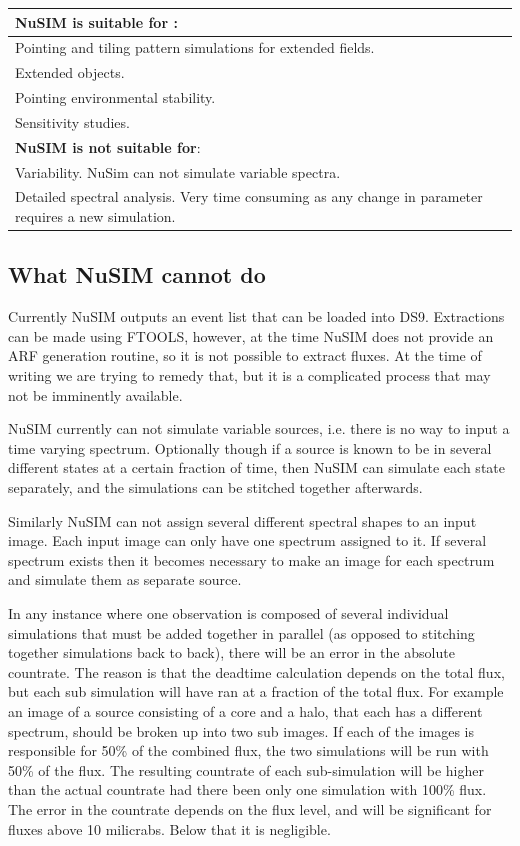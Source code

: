 \documentclass[11pt]{article}
\begin{document}
\begin{center}
\begin{tabular}{|p{9cm}|}
\hline
\hline \textbf{NuSIM is suitable for} : \\ 
\hline  
\hline
Pointing and tiling pattern simulations for extended fields. \\
\hline
Extended objects. \\
\hline
Pointing environmental stability. \\
\hline
Sensitivity studies.\\
\hline
\hline \textbf{NuSIM is not suitable for}: \\
\hline
\hline
Variability. NuSim can not simulate variable spectra. \\
\hline
Detailed spectral analysis. Very time consuming as any change in parameter requires a new simulation.\\
\hline
\end{tabular} 
\end{center}

\subsection{What NuSIM cannot do}
Currently NuSIM outputs an event list that can be loaded into DS9. Extractions can be made using FTOOLS, however, at the time NuSIM does not provide an ARF generation routine, so it is not possible to extract fluxes. At the time of writing we are trying to remedy that, but it is a complicated process that may not be imminently available.

NuSIM currently can not simulate variable sources, i.e. there is no way to input a time varying spectrum. Optionally though if a source is known to be in several different states at a certain fraction of time, then NuSIM can simulate each state separately, and the simulations can be stitched together afterwards.

Similarly NuSIM can not assign several different spectral shapes to an input image. Each input image can only have one spectrum assigned to it. If several spectrum exists then it becomes necessary to make an image for each spectrum and simulate them as separate source.

In any instance where one observation is composed of several individual simulations that must be added together in parallel (as opposed to stitching together simulations back to back), there will be an error in the absolute countrate. The reason is that the deadtime calculation depends on the total flux, but each sub simulation will have ran at a fraction of the total flux. For example an image of a source consisting of a core and a halo, that each has a different spectrum, should be broken up into two sub images. If each of the images is responsible for 50\% of the combined flux, the two simulations will be run with 50\% of the flux. The resulting countrate of each sub-simulation will be higher than the actual countrate had there been only one simulation with 100\% flux. The error in the countrate depends on the flux level, and will be significant for fluxes above 10 milicrabs. Below that it is negligible.  
\end{document}
